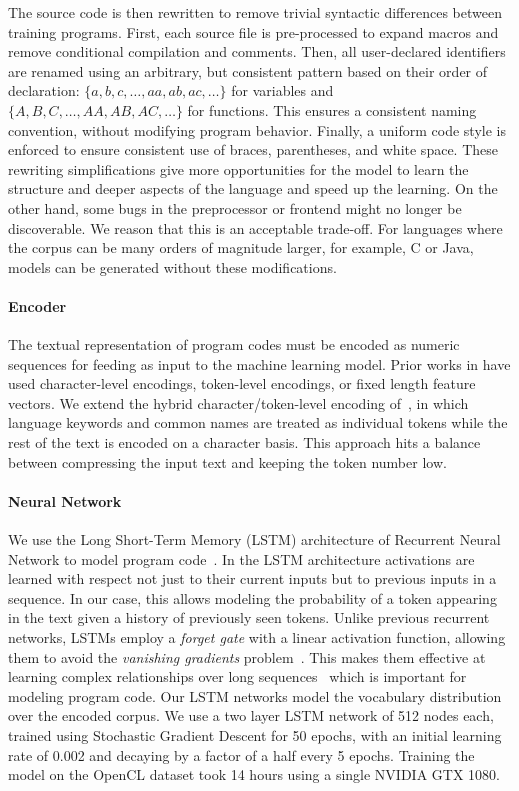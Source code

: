The source code is then rewritten to remove trivial syntactic differences between training programs. First, each source file is pre-processed to expand macros and remove conditional compilation and comments. Then, all user-declared identifiers are renamed using an arbitrary, but consistent pattern based on their order of declaration: $\{a,\allowbreak b,\allowbreak c,\allowbreak \ldots,\allowbreak aa,\allowbreak ab,\allowbreak ac,\allowbreak \ldots\}$ for variables and $\{A,\allowbreak B,\allowbreak C,\allowbreak \ldots,\allowbreak AA,\allowbreak AB,\allowbreak AC,\allowbreak \ldots\}$ for functions. This ensures a consistent naming convention, without modifying program behavior. Finally, a uniform code style is enforced to ensure consistent use of braces, parentheses, and white space. These rewriting simplifications give more opportunities for the model to learn the structure and deeper aspects of the language and speed up the learning. On the other hand, some bugs in the preprocessor or frontend might no longer be discoverable. We reason that this is an acceptable trade-off. For languages where the corpus can be many orders of magnitude larger, for example, C or Java, models can be generated without these modifications.

\paragraph{Encoder} The textual representation of program codes must be encoded as numeric sequences for feeding as input to the machine learning model. Prior works in have used character-level encodings, token-level encodings, or fixed length feature vectors. We extend the hybrid character/token-level encoding of~\cite{Cummins2017b}, in which language keywords and common names are treated as individual tokens while the rest of the text is encoded on a character basis. This approach hits a balance between compressing the input text and keeping the token number low. 

\paragraph{Neural Network} We use the Long Short-Term Memory (LSTM) architecture of Recurrent Neural Network to model program code~\cite{Hochreiter1997}. In the LSTM architecture activations are learned with respect not just to their current inputs but to previous inputs in a sequence. In our case, this allows modeling the probability of a token appearing in the text given a history of previously seen tokens. Unlike previous recurrent networks, LSTMs employ a \emph{forget gate} with a linear activation function, allowing them to avoid the \emph{vanishing gradients} problem~\cite{Pacanu2013}. This makes them effective at learning complex relationships over long sequences~\cite{Lipton2015} which is important for modeling program code. Our LSTM networks model the vocabulary distribution over the encoded corpus. We use a two layer LSTM network of 512 nodes each, trained using Stochastic Gradient Descent for 50 epochs, with an initial learning rate of 0.002 and decaying by a factor of a half every 5 epochs. Training the model on the OpenCL dataset took 14 hours using a single NVIDIA GTX 1080.


